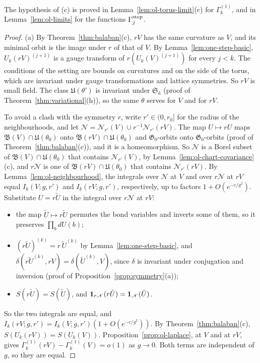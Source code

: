 The hypothesis of (c) is proved in Lemma~\ref{lem:ol-torus-limit}(c) for $\Gamma^{(1)}_k$, and in Lemma~\ref{lem:ol-limits} for the functions $\Gamma^{\rm step}_j$.

\begin{proof}
(a) By Theorem~\ref{thm:balaban}(c), $rV$ has the same curvature as $V$, and its minimal orbit is the image under $r$ of that of $V$. By Lemma~\ref{lem:one-step-basic}, $U_k(rV)^{(j+1)}$ is a gauge transform of $r(U_k(V)^{(j+1)})$ for every $j<k$. The conditions of the setting are bounds on curvatures and on the side of the torus, which are invariant under gauge transformations and lattice symmetries. So $rV$ is small field. The class $\mathfrak U(\theta')$ is invariant under $\mathfrak S_k$ (proof of Theorem~\ref{thm:variational}(h)), so the same $\theta$ serves for $V$ and for $rV$.

To avoid a clash with the symmetry $r$, write $r'\in(0,r_0]$ for the radius of the neighbourhoods, and let $\mathscr N=\mathscr N_{r'}(V)\cup r^{-1}\mathscr N_{r'}(rV)$. The map $U\mapsto rU$ maps $\mathfrak B(V)\cap\mathfrak U(\theta_0)$ onto $\mathfrak B(rV)\cap\mathfrak U(\theta_0)$ and $\mathfrak G_0$-orbits onto $\mathfrak G_0$-orbits (proof of Theorem~\ref{thm:balaban}(c)), and it is a homeomorphism. So $\mathscr N$ is a Borel subset of $\mathfrak B(V)\cap\mathfrak U(\theta_0)$ that contains $\mathscr N_{r'}(V)$, by Lemma~\ref{lem:ol-chart-covariance}(c), and $r\mathscr N$ is one of $\mathfrak B(rV)\cap\mathfrak U(\theta_0)$ that contains $\mathscr N_{r'}(rV)$. By Lemma~\ref{lem:ol-neighbourhood}, the integrals over $\mathscr N$ at $V$ and over $r\mathscr N$ at $rV$ equal $I_k(V;g,r')$ and $I_k(rV;g,r')$, respectively, up to factors $1+O(e^{-c/g^2})$. Substitute $U=r\tilde U$ in the integral over $r\mathscr N$ at $rV$:
\begin{itemize}
\item the map $\tilde U\mapsto r\tilde U$ permutes the bond variables and inverts some of them, so it preserves $\prod_bdU(b)$;
\item $(r\tilde U)^{(k)}=r\,\tilde U^{(k)}$ by Lemma~\ref{lem:one-step-basic}, and $\delta(r\tilde U^{(k)},rV)=\delta(\tilde U^{(k)},V)$, since $\delta$ is invariant under conjugation and inversion (proof of Proposition~\ref{prop:symmetry}(a));
\item $S(r\tilde U)=S(\tilde U)$, and $\mathbf 1_{r\mathscr N}(r\tilde U)=\mathbf 1_{\mathscr N}(\tilde U)$.
\end{itemize}
So the two integrals are equal, and $I_k(rV;g,r')=I_k(V;g,r')(1+O(e^{-c/g^2}))$. By Theorem~\ref{thm:balaban}(c), $S(U_k(rV))=S(U_k(V))$. Proposition~\ref{prop:ol-laplace}, at $V$ and at $rV$, gives $\Gamma^{(1)}_k(rV)-\Gamma^{(1)}_k(V)=o(1)$ as $g\to0$. Both terms are independent of $g$, so they are equal.


\end{proof}
